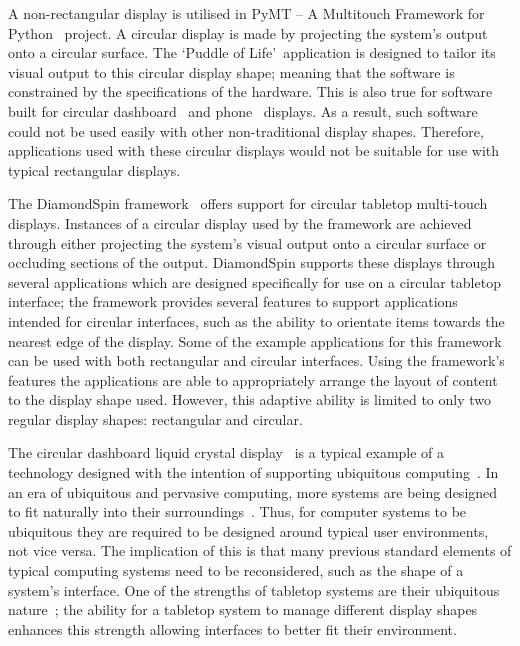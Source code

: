 \documentclass[review,5p,times,twocolumn]{elsarticle}
\begin{document}
A non-rectangular display is utilised in PyMT -- A Multitouch Framework for Python~\cite{Hansen2009} project.
A circular display is made by projecting the system's output onto a circular surface.
The \lq Puddle of Life\rq\ application is designed to tailor its visual output to this circular display shape; meaning that the software is constrained by the specifications of the hardware.
This is also true for software built for circular dashboard~\cite{Boyd2007} and phone~\cite{Finney2009} displays.
As a result, such software could not be used easily with other non-traditional display shapes.
Therefore, applications used with these circular displays would not be suitable for use with typical rectangular displays.

The DiamondSpin framework~\cite{Shen2004} offers support for circular tabletop multi-touch displays.
Instances of a circular display used by the framework are achieved through either projecting the system's visual output onto a circular surface or occluding sections of the output.
DiamondSpin supports these displays through several applications which are designed specifically for use on a circular tabletop interface; the framework provides several features to support applications intended for circular interfaces, such as the ability to orientate items towards the nearest edge of the display.
Some of the example applications for this framework can be used with both rectangular and circular interfaces.
Using the framework's features the applications are able to appropriately arrange the layout of content to the display shape used.
However, this adaptive ability is limited to only two regular display shapes: rectangular and circular.

The circular dashboard liquid crystal display~\cite{Boyd2007} is a typical example of a technology designed with the intention of supporting ubiquitous computing~\cite{Weiser1999}.
In an era of ubiquitous and pervasive computing, more systems are being designed to fit naturally into their surroundings~\cite{Greenfield2006}.
Thus, for computer systems to be ubiquitous they are required to be designed around typical user environments, not vice versa.
The implication of this is that many previous standard elements of typical computing systems need to be reconsidered, such as the shape of a system's interface.
One of the strengths of tabletop systems are their ubiquitous nature~\cite{Smith2012}; the ability for a tabletop system to manage different display shapes enhances this strength allowing interfaces to better fit their environment.
\end{document}
